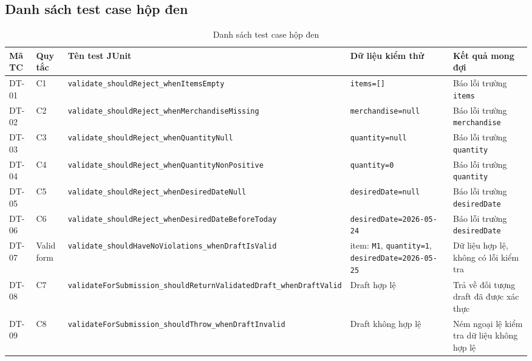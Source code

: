 \documentclass[12pt,a4paper]{article}
\newcommand{\code}[1]{\texttt{#1}}
\begin{document}
\subsection{Danh sách test case hộp đen}

\begin{table}[H]
\centering
\scriptsize
\setlength{\tabcolsep}{3pt}
\renewcommand{\arraystretch}{1.18}
\begin{tabularx}{\textwidth}{
>{\centering\arraybackslash}p{}
>{\centering\arraybackslash}p{}
>{\raggedright\arraybackslash}p{}
>{\raggedright\arraybackslash}p{}
>{\raggedright\arraybackslash}X
}
\toprule
\textbf{Mã TC} &
\textbf{Quy tắc} &
\textbf{Tên test JUnit} &
\textbf{Dữ liệu kiểm thử} &
\textbf{Kết quả mong đợi} \\
\midrule
DT-01 & C1 &
\code{validate\_shouldReject\_whenItemsEmpty} &
\code{items=[]} &
Báo lỗi trường \code{items} \\

DT-02 & C2 &
\code{validate\_shouldReject\_whenMerchandiseMissing} &
\code{merchandise=null} &
Báo lỗi trường \code{merchandise} \\

DT-03 & C3 &
\code{validate\_shouldReject\_whenQuantityNull} &
\code{quantity=null} &
Báo lỗi trường \code{quantity} \\

DT-04 & C4 &
\code{validate\_shouldReject\_whenQuantityNonPositive} &
\code{quantity=0} &
Báo lỗi trường \code{quantity} \\

DT-05 & C5 &
\code{validate\_shouldReject\_whenDesiredDateNull} &
\code{desiredDate=null} &
Báo lỗi trường \code{desiredDate} \\

DT-06 & C6 &
\code{validate\_shouldReject\_whenDesiredDateBeforeToday} &
\code{desiredDate=2026-05-24} &
Báo lỗi trường \code{desiredDate} \\

DT-07 & Valid form &
\code{validate\_shouldHaveNoViolations\_whenDraftIsValid} &
1 item: \code{M1}, \code{quantity=1}, \code{desiredDate=2026-05-25} &
Dữ liệu hợp lệ, không có lỗi kiểm tra \\

DT-08 & C7 &
\code{validateForSubmission\_shouldReturnValidatedDraft\_whenDraftValid} &
Draft hợp lệ &
Trả về đối tượng draft đã được xác thực \\

DT-09 & C8 &
\code{validateForSubmission\_shouldThrow\_whenDraftInvalid} &
Draft không hợp lệ &
Ném ngoại lệ kiểm tra dữ liệu không hợp lệ \\
\bottomrule
\end{tabularx}
\caption{Danh sách test case hộp đen}
\end{table}
\end{document}
